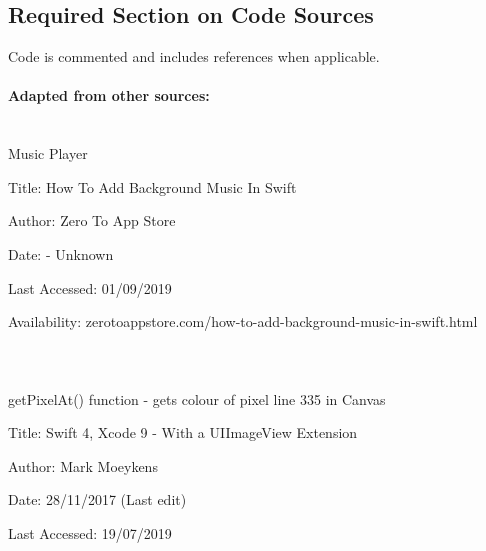 \documentclass[11pt]{article}
\begin{document}
\newpage
\let\Section\section 
\def\section*#1{\Section{#1}}  

    
    
    \newpage
      \subsection{Required Section on Code Sources}
            
            Code is commented and includes references when applicable. 
            
            \paragraph{Adapted from other sources:\\\\}
           
            Music Player 
            
            Title: How To Add Background Music In Swift
            
            Author: Zero To App Store
            
            Date: - Unknown
            
            Last Accessed: 01/09/2019
            
            Availability: zerotoappstore.com/how-to-add-background-music-in-swift.html

            \paragraph{\\}
            
            getPixelAt() function - gets colour of pixel line 335 in Canvas
            
            Title: Swift 4, Xcode 9 - With a UIImageView Extension
            
            Author: Mark Moeykens
            
            Date: 28/11/2017 (Last edit)
            
            Last Accessed: 19/07/2019
            
\end{document}
